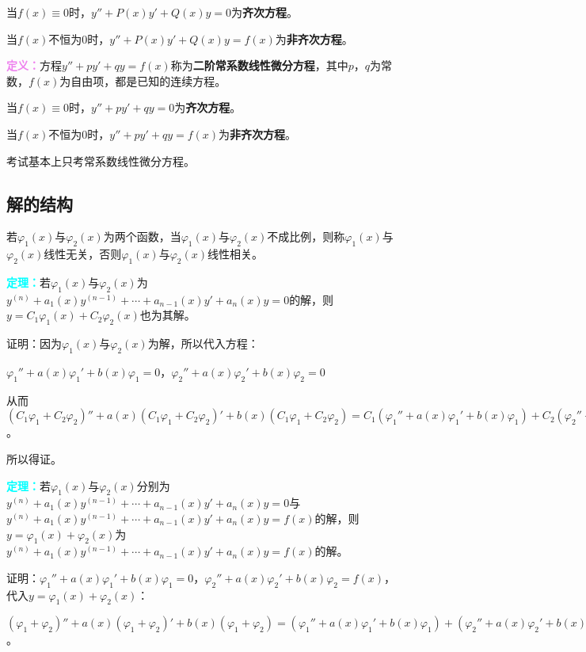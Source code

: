 \documentclass[UTF8, 12pt]{ctexart}
\begin{document}
        当$f(x)\equiv0$时，$y''+P(x)y'+Q(x)y=0$为\textbf{齐次方程}。

        当$f(x)$不恒为0时，$y''+P(x)y'+Q(x)y=f(x)$为\textbf{非齐次方程}。

        \textcolor{violet}{\textbf{定义：}}方程$y''+py'+qy=f(x)$称为\textbf{二阶常系数线性微分方程}，其中$p$，$q$为常数，$f(x)$为自由项，都是已知的连续方程。

        当$f(x)\equiv0$时，$y''+py'+qy=0$为\textbf{齐次方程}。

        当$f(x)$不恒为0时，$y''+py'+qy=f(x)$为\textbf{非齐次方程}。

        考试基本上只考常系数线性微分方程。

        \subsection{解的结构}

        若$\varphi_1(x)$与$\varphi_2(x)$为两个函数，当$\varphi_1(x)$与$\varphi_2(x)$不成比例，则称$\varphi_1(x)$与$\varphi_2(x)$线性无关，否则$\varphi_1(x)$与$\varphi_2(x)$线性相关。

        \textcolor{aqua}{\textbf{定理：}}若$\varphi_1(x)$与$\varphi_2(x)$为$y^{(n)}+a_1(x)y^{(n-1)}+\cdots+a_{n-1}(x)y'+a_n(x)y=0$的解，则$y=C_1\varphi_1(x)+C_2\varphi_2(x)$也为其解。

        证明：因为$\varphi_1(x)$与$\varphi_2(x)$为解，所以代入方程：

        $\varphi_1''+a(x)\varphi_1'+b(x)\varphi_1=0$，$\varphi_2''+a(x)\varphi_2'+b(x)\varphi_2=0$

        从而$(C_1\varphi_1+C_2\varphi_2)''+a(x)(C_1\varphi_1+C_2\varphi_2)'+b(x)(C_1\varphi_1+C_2\varphi_2)=C_1(\varphi_1''+a(x)\varphi_1'+b(x)\varphi_1)+C_2(\varphi_2''+a(x)\varphi_2'+b(x)\varphi_2)=0$。

        所以得证。

        \textcolor{aqua}{\textbf{定理：}}若$\varphi_1(x)$与$\varphi_2(x)$分别为$y^{(n)}+a_1(x)y^{(n-1)}+\cdots+a_{n-1}(x)y'+a_n(x)y=0$与$y^{(n)}+a_1(x)y^{(n-1)}+\cdots+a_{n-1}(x)y'+a_n(x)y=f(x)$的解，则$y=\varphi_1(x)+\varphi_2(x)$为$y^{(n)}+a_1(x)y^{(n-1)}+\cdots+a_{n-1}(x)y'+a_n(x)y=f(x)$的解。

        证明：$\varphi_1''+a(x)\varphi_1'+b(x)\varphi_1=0$，$\varphi_2''+a(x)\varphi_2'+b(x)\varphi_2=f(x)$，代入$y=\varphi_1(x)+\varphi_2(x)$：

        $(\varphi_1+\varphi_2)''+a(x)(\varphi_1+\varphi_2)'+b(x)(\varphi_1+\varphi_2)=(\varphi_1''+a(x)\varphi_1'+b(x)\varphi_1)+(\varphi_2''+a(x)\varphi_2'+b(x)\varphi_2)=f(x)$。
\end{document}
